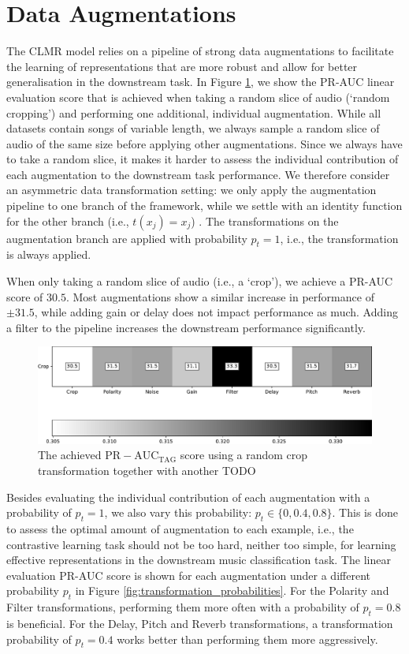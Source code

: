 \section{Data Augmentations}
The CLMR model relies on a pipeline of strong data augmentations to facilitate the learning of representations that are more robust and allow for better generalisation in the downstream task.
In Figure \ref{fig:transformation_study}, we show the PR-AUC linear evaluation score that is achieved when taking a random slice of audio (`random cropping') and performing one additional, individual augmentation.
While all datasets contain songs of variable length, we always sample a random slice of audio of the same size before applying other augmentations.
Since we always have to take a random slice, it makes it harder to assess the individual contribution of each augmentation to the downstream task performance.
We therefore consider an asymmetric data transformation setting: we only apply the augmentation pipeline to one branch of the framework, while we settle with an identity function for the other branch (i.e., $t(x_j) = x_j$) \cite{chen_simple_2020}. The transformations on the augmentation branch are applied with probability $p_t=1$, i.e., the transformation is always applied.

When only taking a random slice of audio (i.e., a `crop'), we achieve a PR-AUC score of $30.5$.
Most augmentations show a similar increase in performance of $±31.5$, while adding gain or delay does not impact performance as much.
Adding a filter to the pipeline increases the downstream performance significantly.

\begin{figure}[h]
    \centering
    \includegraphics[width=\columnwidth]{figs/transformation_study.pdf}
    \caption{The achieved $\mathrm{PR-AUC}_{\mathrm{TAG}}$ score using a random crop transformation together with another TODO}
    \label{fig:transformation_study}
\end{figure}

Besides evaluating the individual contribution of each augmentation with a probability of $p_t = 1$, we also vary this probability: $p_t \in \{ 0, 0.4, 0.8 \}$.
This is done to assess the optimal amount of augmentation to each example, i.e., the contrastive learning task should not be too hard, neither too simple, for learning effective representations in the downstream music classification task.
The linear evaluation PR-AUC score is shown for each augmentation under a different probability $p_t$ in Figure \ref{fig:transformation_probabilities}. For the Polarity and Filter transformations, performing them more often with a probability of $p_t = 0.8$ is beneficial. For the Delay, Pitch and Reverb transformations, a transformation probability of $p_t = 0.4$ works better than performing them more aggressively.

